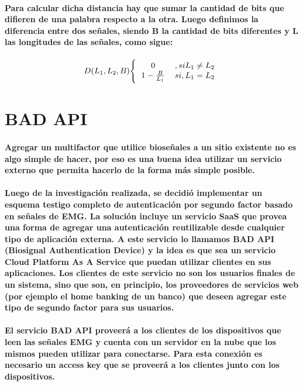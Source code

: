 \documentclass{article}
\begin{document}
\paragraph{
Para calcular dicha distancia hay que sumar la cantidad de bits que difieren de una palabra respecto a la otra. Luego definimos la diferencia entre dos señales, siendo B la cantidad de bits diferentes y L las longitudes de las señales, como sigue:
}

\begin{center}
\[
D(L_1, L_2, B)
\Bigg\{
  \begin{tabular}{ c c }
  0 & $, si L_1 \neq L_2$ \\
  $1 - \frac{B}{L_1}$ & $si, L_1 = L_2$
  \end{tabular}
\]
\end{center}

\section{BAD API}
\paragraph{
Agregar un multifactor que utilice bioseñales a un sitio existente no es algo simple de hacer, por eso es una buena idea utilizar un servicio externo que permita hacerlo de la forma más simple posible.
}
\paragraph{
Luego de la investigación realizada, se decidió implementar un esquema testigo completo de autenticación por segundo factor basado en señales de EMG.  La solución incluye un servicio SaaS que provea una forma de agregar una autenticación reutilizable desde cualquier tipo de aplicación externa. A este servicio lo llamamos BAD API (Biosignal Authentication Device) y la idea es que sea un servicio Cloud Platform As A Service que puedan utilizar clientes en sus aplicaciones. Los clientes de este servicio no son los usuarios finales de un sistema, sino que son, en principio, los proveedores de servicios web (por ejemplo el home banking de un banco) que deseen agregar este tipo de segundo factor para sus usuarios.
}
\paragraph{
El servicio BAD API proveerá a los clientes de los dispositivos que leen las señales EMG y cuenta con un servidor en la nube que los mismos pueden utilizar para conectarse. Para esta conexión es necesario un access key que se proveerá a los clientes junto con los dispositivos.
}
\end{document}
